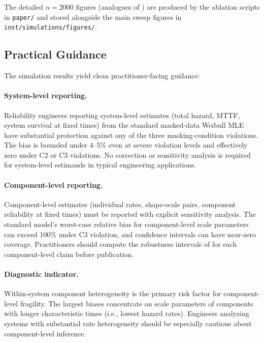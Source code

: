 The detailed $n = 2000$ figures (analogues of
)
are produced by the ablation scripts in \texttt{paper/} and stored
alongside the main sweep figures in
\texttt{inst/simulations/figures/}.

\subsection{Practical Guidance}
\label{sec:sim-practice}

The simulation results yield clean practitioner-facing guidance:

\paragraph{System-level reporting.}
Reliability engineers reporting system-level estimates (total hazard,
MTTF, system survival at fixed times) from the standard masked-data
Weibull MLE have substantial protection against any of the three
masking-condition violations. The bias is bounded under 4--5\% even at
severe violation levels and effectively zero under C2 or C3 violations.
No correction or sensitivity analysis is required for system-level
estimands in typical engineering applications.

\paragraph{Component-level reporting.}
Component-level estimates (individual rates, shape-scale pairs,
component reliability at fixed times) must be reported with explicit
sensitivity analysis. The standard model's worst-case relative bias for
component-level scale parameters can exceed 100\% under C3 violation,
and confidence intervals can have near-zero coverage. Practitioners
should compute the robustness intervals of  for each
component-level claim before publication.

\paragraph{Diagnostic indicator.}
Within-system component heterogeneity is the primary risk factor for
component-level fragility. The largest biases concentrate on scale
parameters of components with longer characteristic times (i.e., lowest
hazard rates). Engineers analyzing systems with substantial rate
heterogeneity should be especially cautious about component-level
inference.
